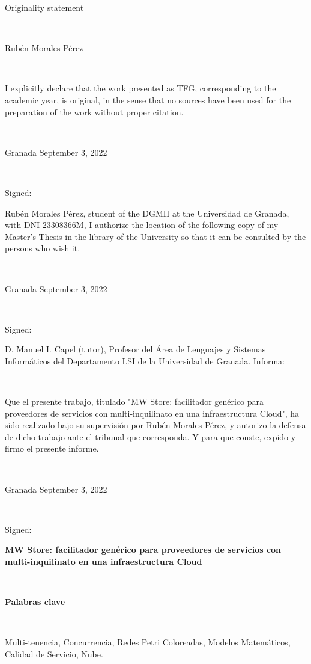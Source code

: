 \documentclass[12pt,english]{article} %
\begin{document}
Originality statement

\

Rubén Morales Pérez

\

I explicitly declare that the work presented as TFG,
corresponding to the academic year, is original, in the sense that no sources have been used for the preparation of the work without proper citation.

\

Granada September 3, 2022

\

Signed:


\newpage

Rubén Morales Pérez, student of the DGMII at the Universidad de Granada, with DNI 23308366M, I authorize the location of the following copy of my Master's Thesis %
in the library of the University so that it can be consulted by the persons who wish it.

\

Granada September 3, 2022

\

Signed:

\newpage


D. Manuel I. Capel (tutor), Profesor del Área de Lenguajes y Sistemas Informáticos del Departamento LSI de la Universidad de Granada.
Informa:

\

Que el presente trabajo, titulado "MW Store: facilitador genérico para proveedores de servicios con multi-inquilinato en una infraestructura
Cloud", ha sido realizado bajo su supervisión por Rubén Morales Pérez, y autorizo la defensa de dicho trabajo ante el tribunal que corresponda.
Y para que conste, expido y firmo el presente informe.

\

Granada September 3, 2022

\

Signed:

\newpage
\shipout\null %
\newpage

\textbf{MW Store: facilitador genérico para proveedores de servicios con multi-inquilinato en una infraestructura Cloud}

\

\textbf{Palabras clave}

\

Multi-tenencia, Concurrencia, Redes Petri Coloreadas, Modelos Matemáticos, Calidad de Servicio, Nube.
\end{document}
